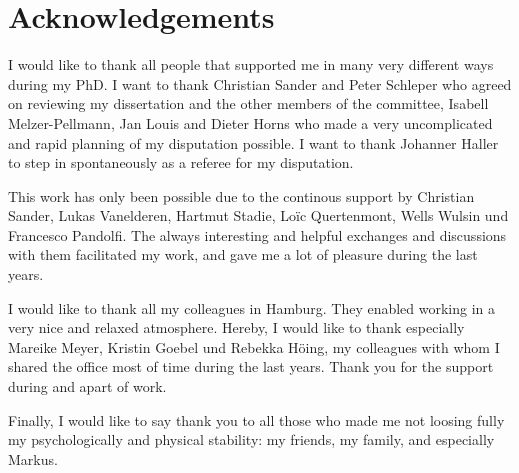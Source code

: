 \chapter*{Acknowledgements}
\vspace{1cm}

I would like to thank all people that supported me in many very different ways during my PhD.
I want to thank Christian Sander and Peter Schleper who agreed on reviewing my dissertation 
and the other members of the committee, Isabell Melzer-Pellmann, Jan Louis and Dieter Horns who made a very uncomplicated and rapid planning of my disputation possible.
I want to thank Johanner Haller to step in spontaneously as a referee for my disputation.

This work has only been possible due to the continous support by Christian Sander, Lukas Vanelderen, Hartmut Stadie, Lo\"{i}c Quertenmont, Wells Wulsin und Francesco Pandolfi.
The always interesting and helpful exchanges and discussions with them facilitated my work, and gave me a lot of pleasure during the last years. 

I would like to thank all my colleagues in Hamburg. They enabled working in a very nice and relaxed atmosphere. 
Hereby, I would like to thank especially Mareike Meyer, Kristin Goebel und Rebekka H\"{o}ing, my colleagues with whom I shared the office most of time during the last years. 
Thank you for the support during and apart of work.

Finally, I would like to say thank you to all those who made me not loosing fully my psychologically and physical stability: my friends, my family, and especially Markus.







